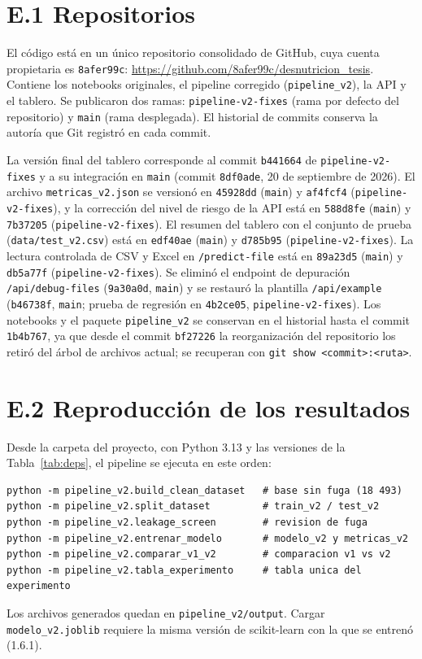 
\section*{E.1 Repositorios}
El código está en un único repositorio consolidado de GitHub, cuya cuenta propietaria es \texttt{8afer99c}: \url{https://github.com/8afer99c/desnutricion_tesis}. Contiene los notebooks originales, el pipeline corregido (\texttt{pipeline\_v2}), la API y el tablero. Se publicaron dos ramas: \texttt{pipeline-v2-fixes} (rama por defecto del repositorio) y \texttt{main} (rama desplegada). El historial de commits conserva la autoría que Git registró en cada commit.

La versión final del tablero corresponde al commit \texttt{b441664} de \texttt{pipeline-v2-fixes} y a su integración en \texttt{main} (commit \texttt{8df0ade}, 20 de septiembre de 2026). El archivo \texttt{metricas\_v2.json} se versionó en \texttt{45928dd} (\texttt{main}) y \texttt{af4fcf4} (\texttt{pipeline-v2-fixes}), y la corrección del nivel de riesgo de la API está en \texttt{588d8fe} (\texttt{main}) y \texttt{7b37205} (\texttt{pipeline-v2-fixes}). El resumen del tablero con el conjunto de prueba (\texttt{data/test\_v2.csv}) está en \texttt{edf40ae} (\texttt{main}) y \texttt{d785b95} (\texttt{pipeline-v2-fixes}). La lectura controlada de CSV y Excel en \texttt{/predict-file} está en \texttt{89a23d5} (\texttt{main}) y \texttt{db5a77f} (\texttt{pipeline-v2-fixes}). Se eliminó el endpoint de depuración \texttt{/api/debug-files} (\texttt{9a30a0d}, \texttt{main}) y se restauró la plantilla \texttt{/api/example} (\texttt{b46738f}, \texttt{main}; prueba de regresión en \texttt{4b2ce05}, \texttt{pipeline-v2-fixes}). Los notebooks y el paquete \texttt{pipeline\_v2} se conservan en el historial hasta el commit \texttt{1b4b767}, ya que desde el commit \texttt{bf27226} la reorganización del repositorio los retiró del árbol de archivos actual; se recuperan con \texttt{git show <commit>:<ruta>}.

\section*{E.2 Reproducción de los resultados}
Desde la carpeta del proyecto, con Python 3.13 y las versiones de la Tabla~\ref{tab:deps}, el pipeline se ejecuta en este orden:
\begin{lstlisting}[frame=single,basicstyle=\ttfamily\footnotesize]
python -m pipeline_v2.build_clean_dataset   # base sin fuga (18 493)
python -m pipeline_v2.split_dataset         # train_v2 / test_v2
python -m pipeline_v2.leakage_screen        # revision de fuga
python -m pipeline_v2.entrenar_modelo       # modelo_v2 y metricas_v2
python -m pipeline_v2.comparar_v1_v2        # comparacion v1 vs v2
python -m pipeline_v2.tabla_experimento     # tabla unica del experimento
\end{lstlisting}
Los archivos generados quedan en \texttt{pipeline\_v2/output}. Cargar \texttt{modelo\_v2.joblib} requiere la misma versión de scikit-learn con la que se entrenó (1.6.1).

